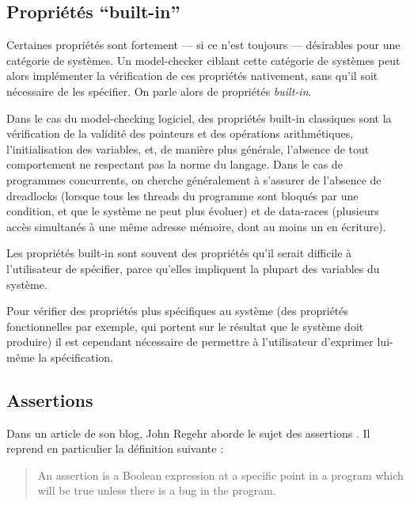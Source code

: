 \subsection{\texorpdfstring{Propriétés ``built-in''}{Propriétés built-in}}

Certaines propriétés sont fortement --- si ce n'est toujours --- désirables
pour une catégorie de systèmes. Un model-checker ciblant cette catégorie
de systèmes peut alors implémenter la vérification de ces propriétés
nativement, sans qu'il soit nécessaire de les spécifier. On parle alors
de propriétés \emph{built-in}.

Dans le cas du model-checking logiciel, des propriétés built-in
classiques sont la vérification de la validité des pointeurs et des
opérations arithmétiques, l'initialisation des variables, et, de manière
plus générale, l'absence de tout comportement ne respectant pas la norme
du langage.
Dans le cas de programmes concurrents, on cherche généralement à s'assurer de
l'absence de dreadlocks (lorsque tous les threads du programme sont bloqués par une
condition, et que le système ne peut plus évoluer) et de data-races (plusieurs
accès simultanés à une même adresse mémoire, dont au moins un en écriture).

Les propriétés built-in sont souvent des propriétés qu'il serait difficile à
l'utilisateur de spécifier, parce qu'elles impliquent la plupart des variables
du système.

Pour vérifier des propriétés plus spécifiques au système (des propriétés
fonctionnelles par exemple, qui portent sur le résultat que le système doit
produire) il est cependant nécessaire de permettre à l'utilisateur d'exprimer
lui-même la spécification.

\subsection{Assertions}

Dans un article de son blog, John Regehr aborde le sujet des assertions
\cite{assertion_regehr}. Il reprend en particulier la définition suivante :

\begin{quotation}
An assertion is a Boolean expression at a specific point in a program which will
be true unless there is a bug in the program.
\hfill \cite{assertion_regehr}
\end{quotation}


